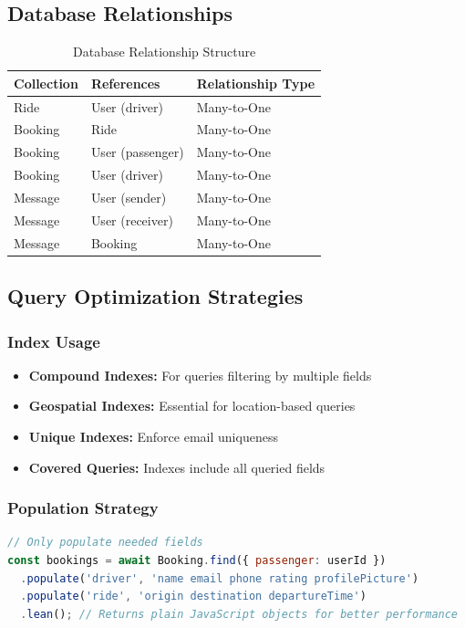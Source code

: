 \documentclass[12pt,a4paper]{article}
\begin{document}
\subsection{Database Relationships}

\begin{table}[H]
\centering
\begin{tabular}{|l|l|l|}
\hline
\textbf{Collection} & \textbf{References} & \textbf{Relationship Type} \\
\hline
Ride & User (driver) & Many-to-One \\
Booking & Ride & Many-to-One \\
Booking & User (passenger) & Many-to-One \\
Booking & User (driver) & Many-to-One \\
Message & User (sender) & Many-to-One \\
Message & User (receiver) & Many-to-One \\
Message & Booking & Many-to-One \\
\hline
\end{tabular}
\caption{Database Relationship Structure}
\end{table}

\subsection{Query Optimization Strategies}

\subsubsection{Index Usage}
\begin{itemize}
    \item \textbf{Compound Indexes:} For queries filtering by multiple fields
    \item \textbf{Geospatial Indexes:} Essential for location-based queries
    \item \textbf{Unique Indexes:} Enforce email uniqueness
    \item \textbf{Covered Queries:} Indexes include all queried fields
\end{itemize}

\subsubsection{Population Strategy}
\begin{lstlisting}[language=JavaScript, caption=Efficient Population]
// Only populate needed fields
const bookings = await Booking.find({ passenger: userId })
  .populate('driver', 'name email phone rating profilePicture')
  .populate('ride', 'origin destination departureTime')
  .lean(); // Returns plain JavaScript objects for better performance
\end{lstlisting}
\end{document}

